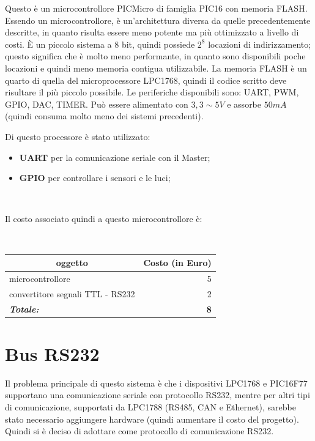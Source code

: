 \documentclass[a4paper,titlepage]{book}
\begin{document}
Questo è un microcontrollore PICMicro di famiglia PIC16 con memoria FLASH. Essendo un microcontrollore, è un'architettura diversa da quelle precedentemente descritte, in quanto risulta essere meno potente ma più ottimizzato a livello di costi. È un piccolo sistema a 8 bit, quindi possiede $2^8$ locazioni di indirizzamento; questo significa che è molto meno performante, in quanto sono disponibili poche locazioni e quindi meno memoria contigua utilizzabile. La memoria FLASH è un quarto di quella del microprocessore LPC1768, quindi il codice scritto deve risultare il più piccolo possibile. Le periferiche disponibili sono: UART, PWM, GPIO, DAC, TIMER. Può essere alimentato con $3,3 \sim 5 V$ e assorbe $50 mA$ (quindi consuma molto meno dei sistemi precedenti).

Di questo processore è stato utilizzato:

\begin{itemize}[noitemsep,topsep=10pt,parsep=23pt,partopsep=0pt]
\item \textbf{UART} per la comunicazione seriale con il Master;
\item \textbf{GPIO} per controllare i sensori e le luci;
\end{itemize}
 
~

Il costo associato quindi a questo microcontrollore è:

~

\begin{tabular}{|l  r|}
\hline
\multicolumn{1}{|c|}{\textbf {oggetto}} & \multicolumn{1}{c|}{\textbf {Costo (in Euro)}} \\
\hline

microcontrollore			& 5 \\
convertitore segnali TTL - RS232 	& 2  \\
\hline
\hline

\textit{\textbf{Totale:}}		& \textbf{8} \\

\hline
\end{tabular}

\section{Bus RS232}



Il problema principale di questo sistema è che i dispositivi LPC1768 e PIC16F77 supportano una comunicazione seriale con protocollo RS232, mentre per altri tipi di comunicazione, supportati da LPC1788 (RS485, CAN e Ethernet), sarebbe stato necessario aggiungere hardware (quindi aumentare il costo del progetto). Quindi si è deciso di adottare come protocollo di comunicazione RS232.
\end{document}
